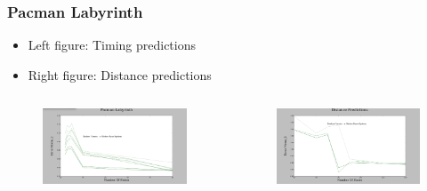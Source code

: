\documentclass{beamer}
\begin{document}


\begin{frame}
\frametitle{Pacman Labyrinth}

\begin{itemize}
\item Left figure: Timing predictions
\item Right figure: Distance predictions

\end{itemize}


\begin{columns}[c]

\begin{figure}
\includegraphics[width=1.0\linewidth]{lucasplots/monImages/PacmanLabyrinth.png}
\end{figure}


\begin{figure}
\includegraphics[width=1.0\linewidth]{lucasplots/monImages/Distance_Predictions.png}
\end{figure}

\end{columns}

\end{frame}
\end{document}
